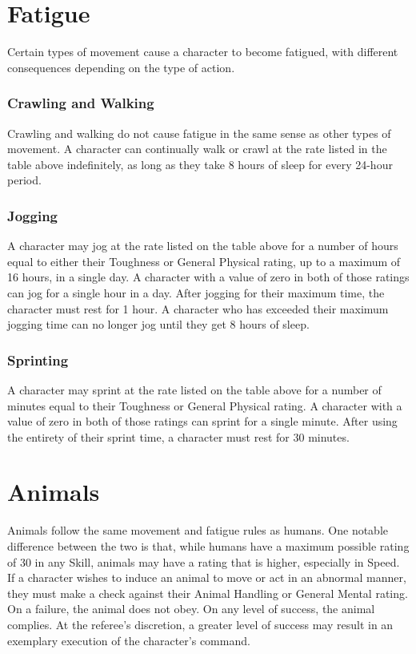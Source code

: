 \documentclass[oneside]{book}
\begin{document}
\begin{multicols}{2}
\section{Fatigue}
Certain types of movement cause a character to become fatigued, with different consequences depending on the type of action. 

\subsubsection{Crawling and Walking}
Crawling and walking do not cause fatigue in the same sense as other types of movement. A character can continually walk or crawl at the rate listed in the table above indefinitely, as long as they take 8 hours of sleep for every 24-hour period. 

\subsubsection{Jogging}
A character may jog at the rate listed on the table above for a number of hours equal to either their Toughness or General Physical rating, up to a maximum of 16 hours, in a single day. A character with a value of zero in both of those ratings can jog for a single hour in a day. After jogging for their maximum time, the character must rest for 1 hour. A character who has exceeded their maximum jogging time can no longer jog until they get 8 hours of sleep. 

\subsubsection{Sprinting}
A character may sprint at the rate listed on the table above for a number of minutes equal to their Toughness or General Physical rating. A character with a value of zero in both of those ratings can sprint for a single minute. After using the entirety of their sprint time, a character must rest for 30 minutes. 

\section{Animals}
Animals follow the same movement and fatigue rules as humans. One notable difference between the two is that, while humans have a maximum possible rating of 30 in any Skill, animals may have a rating that is higher, especially in Speed. If a character wishes to induce an animal to move or act in an abnormal manner, they must make a check against their Animal Handling or General Mental rating. On a failure, the animal does not obey. On any level of success, the animal complies. At the referee's discretion, a greater level of success may result in an exemplary execution of the character's command. 


\end{multicols}
\end{document}
